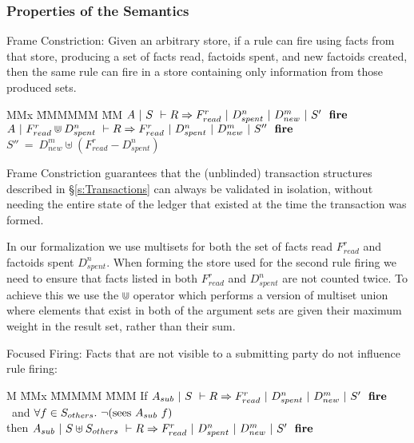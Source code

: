 \subsubsection{Properties of the Semantics}
\label{s:PropertiesOfSemantics}
\begin{theorem}
Frame Constriction:
Given an arbitrary store, if a rule can fire using facts from that store, producing a set of facts read, factoids spent, and new factoids created, then the same rule can fire in a store containing only information from those produced sets.
\end{theorem}
\begin{tabbing}
MMx \= MMMMMM \= MM \kill
{}     \> $A~|~S~\vdash R \Rightarrow F_{read}^r~|~D_{spent}^n~|~D_{new}^m~|~S'~~\textbf{fire}$ \\
   \> $A~|~F_{read}^r \Cup D_{spent}^n~\vdash R \Rightarrow F_{read}^r~|~D_{spent}^n~|~D_{new}^m~|~S''~~\textbf{fire}$ \\
             \>  $S'' ~=~ D_{new}^m \uplus (F_{read}^r - D_{spent}^n)$
\end{tabbing}

Frame Constriction guarantees that the (unblinded) transaction structures described in \S\ref{s:Transactions} can always be validated in isolation, without needing the entire state of the ledger that existed at the time the transaction was formed.

In our formalization we use multisets for both the set of facts read $F^r_{read}$ and factoids spent $D^n_{spent}$. When forming the store used for the second rule firing we need to ensure that facts listed in both $F^r_{read}$ and $D^n_{spent}$ are not counted twice. To achieve this we use the $\Cup$ operator which performs a version of multiset union where elements that exist in both of the argument sets are given their maximum weight in the result set, rather than their sum.



\begin{theorem}
Focused Firing: Facts that are not visible to a submitting party do not influence rule firing:
\end{theorem}
\begin{tabbing}
M \= MMx \= MMMMM \= MMM \kill
\> If     \> $A_{sub}~|~S~\vdash R \Rightarrow F_{read}^r~|~D_{spent}^n~|~D_{new}^m~|~S'~~\textbf{fire}$ \\
\> ~and   \> $\forall f \in S_{others}.\ \neg (\textrm{sees}~ A_{sub}~ f)$ \\
\> then   \> $A_{sub}~|~S \uplus S_{others}~\vdash R \Rightarrow F_{read}^r~|~D_{spent}^n~|~D_{new}^m~|~S'~~\textbf{fire}$
\end{tabbing}

